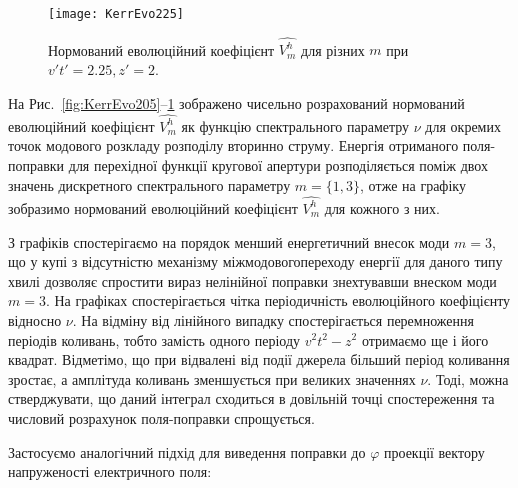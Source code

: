 \begin{figure}[htbp] \begin{center}
\texttt{[image: KerrEvo225]}
\caption{Нормований еволюційний коефіцієнт $ \hat{V_m^h} $ для 
різних $ m $ при $ v't' = 2.25, z' = 2 $.} 
\label{fig:KerrEvo225}
\end{center} \end{figure}

На Рис.~\ref{fig:KerrEvo205}--\ref{fig:KerrEvo225} зображено чисельно 
розрахований нормований еволюційний коефіцієнт $ \hat{V_m^h} $ як функцію 
спектрального параметру $ \nu $ для окремих точок модового розкладу розподілу 
вторинно струму. Енергія отриманого поля-поправки для перехідної функції 
кругової апертури розподіляється поміж двох значень дискретного спектрального 
параметру $ m = \{ 1, 3\} $, отже на графіку зобразимо нормований еволюційний 
коефіцієнт $ \hat{V_m^h} $ для кожного з них.

З графіків спостерігаємо на порядок менший енергетичний внесок моди $ m = 3 $, 
що у купі з відсутністю механізму міжмодовогопереходу енергії для даного типу 
хвилі дозволяє спростити вираз нелінійної поправки знехтувавши внеском моди 
$ m = 3 $. На графіках спостерігається чітка періодичність еволюційного 
коефіцієнту відносно $ \nu $. На відміну від лінійного випадку спостерігається 
перемноження періодів коливань, тобто замість одного періоду $ v^2t^2 - z^2 $ 
отримаємо ще і його квадрат. Відметімо, що при відвалені від події джерела 
більший період коливання зростає, а амплітуда коливань зменшується при 
великих значеннях $ \nu $. Тоді, можна стверджувати, що даний інтеграл 
сходиться в довільній точці спостереження та числовий розрахунок 
поля-поправки спрощується.

Застосуємо аналогічний підхід для виведення поправки до $ \varphi $ проекції 
вектору напруженості електричного поля:


